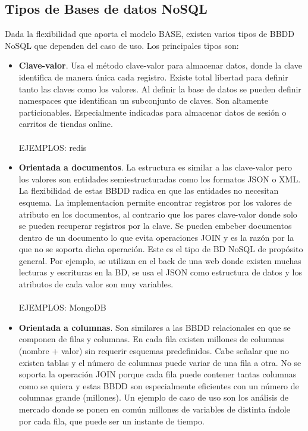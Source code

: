 \subsection{Tipos de Bases de datos NoSQL}
Dada la flexibilidad que aporta el modelo BASE, existen varios tipos de BBDD NoSQL que dependen del caso de uso. Los principales tipos son:
\begin{itemize}
	\item \textbf{Clave-valor}. Usa el método clave-valor para almacenar datos, donde la clave identifica de manera única cada registro. Existe total libertad para definir tanto las claves como los valores. Al definir la base de datos se pueden definir namespaces que identifican un subconjunto de claves. Son altamente particionables. Especialmente indicadas para almacenar datos de sesión o carritos de tiendas online.\\\\
	EJEMPLOS: redis
	\item \textbf{Orientada a documentos}. La estructura es similar a las clave-valor pero los valores son entidades semiestructuradas como los formatos JSON o XML. La flexibilidad de estas BBDD radica en que las entidades no necesitan esquema. La implementacion permite encontrar registros por los valores de atributo en los documentos, al contrario que los pares clave-valor donde solo se pueden recuperar registros por la clave. Se pueden embeber documentos dentro de un documento lo que evita operaciones JOIN y es la razón por la que no se soporta dicha operación. Este es el tipo de BD NoSQL de propósito general. Por ejemplo, se utilizan en el back de una web donde existen muchas lecturas y escrituras en la BD, se usa el JSON como estructura de datos y los atributos de cada valor son muy variables.\\\\
	EJEMPLOS: MongoDB
	\item \textbf{Orientada a columnas}. Son similares a las BBDD relacionales en que se componen de filas y columnas. En cada fila existen millones de columnas (nombre + valor) sin requerir esquemas predefinidos. Cabe señalar que no existen tablas y el número de columnas puede variar de una fila a otra. No se soporta la operación JOIN porque cada fila puede contener tantas columnas como se quiera y estas BBDD son especialmente eficientes con un número de columnas grande (millones). Un ejemplo de caso de uso son los análisis de mercado donde se ponen en común millones de variables de distinta índole por cada fila, que puede ser un instante de tiempo.\\\\

\end{itemize}
